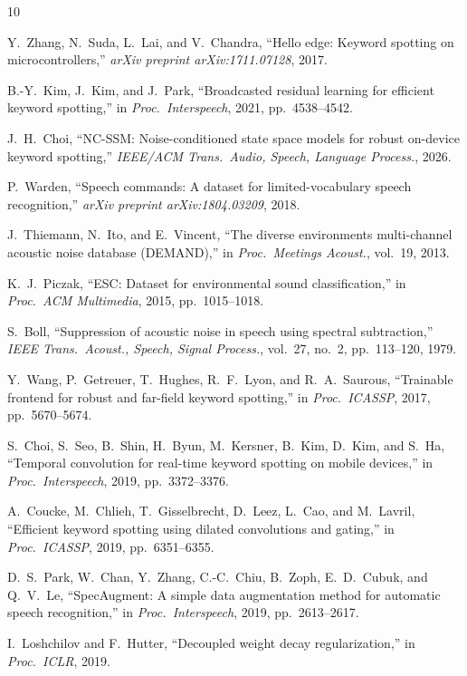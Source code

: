 \documentclass[conference]{IEEEtran}
\begin{document}
\begin{thebibliography}{10}

Y.~Zhang, N.~Suda, L.~Lai, and V.~Chandra,
``Hello edge: Keyword spotting on microcontrollers,''
\emph{arXiv preprint arXiv:1711.07128}, 2017.

B.-Y.~Kim, J.~Kim, and J.~Park,
``Broadcasted residual learning for efficient keyword spotting,''
in \emph{Proc.\ Interspeech}, 2021, pp.~4538--4542.

J.~H.~Choi,
``NC-SSM: Noise-conditioned state space models for robust on-device keyword spotting,''
\emph{IEEE/ACM Trans.\ Audio, Speech, Language Process.}, 2026.

P.~Warden,
``Speech commands: A dataset for limited-vocabulary speech recognition,''
\emph{arXiv preprint arXiv:1804.03209}, 2018.

J.~Thiemann, N.~Ito, and E.~Vincent,
``The diverse environments multi-channel acoustic noise database (DEMAND),''
in \emph{Proc.\ Meetings Acoust.}, vol.~19, 2013.

K.~J.~Piczak,
``ESC: Dataset for environmental sound classification,''
in \emph{Proc.\ ACM Multimedia}, 2015, pp.~1015--1018.

S.~Boll,
``Suppression of acoustic noise in speech using spectral subtraction,''
\emph{IEEE Trans.\ Acoust., Speech, Signal Process.}, vol.~27, no.~2, pp.~113--120, 1979.

Y.~Wang, P.~Getreuer, T.~Hughes, R.~F.~Lyon, and R.~A.~Saurous,
``Trainable frontend for robust and far-field keyword spotting,''
in \emph{Proc.\ ICASSP}, 2017, pp.~5670--5674.

S.~Choi, S.~Seo, B.~Shin, H.~Byun, M.~Kersner, B.~Kim, D.~Kim, and S.~Ha,
``Temporal convolution for real-time keyword spotting on mobile devices,''
in \emph{Proc.\ Interspeech}, 2019, pp.~3372--3376.

A.~Coucke, M.~Chlieh, T.~Gisselbrecht, D.~Leez, L.~Cao, and M.~Lavril,
``Efficient keyword spotting using dilated convolutions and gating,''
in \emph{Proc.\ ICASSP}, 2019, pp.~6351--6355.

D.~S.~Park, W.~Chan, Y.~Zhang, C.-C.~Chiu, B.~Zoph, E.~D.~Cubuk, and Q.~V.~Le,
``SpecAugment: A simple data augmentation method for automatic speech recognition,''
in \emph{Proc.\ Interspeech}, 2019, pp.~2613--2617.

I.~Loshchilov and F.~Hutter,
``Decoupled weight decay regularization,''
in \emph{Proc.\ ICLR}, 2019.

\end{thebibliography}
\end{document}
